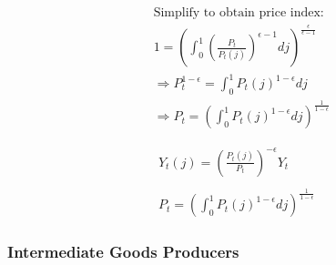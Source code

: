 \documentclass[11pt,preprint]{elsarticle}
\numberwithin{equation}{section}
\numberwithin{figure}{section}
\numberwithin{table}{section}
\begin{document}
\begin{align*}
& \\
\end{align*} \begin{align*} 
& \text{Simplify to obtain price index:} \\  
& 1 = \left( \int_0^1 \left( \frac{P_t}{P_t(j)} \right)^{\epsilon-1}  dj \right)^{\frac{\epsilon}{\epsilon-1}} \\  
& \Rightarrow P_t^{1-\epsilon} = \int_0^1 P_t(j)^{1-\epsilon}  dj \\  
& \Rightarrow P_t = \left( \int_0^1 P_t(j)^{1-\epsilon}  dj \right)^{\frac{1}{1-\epsilon}}  
\end{align*}

\begin{equation}\label{demand_and_price}  
\boxed{  
  \begin{gathered}  
  Y_t(j) = \left( \frac{P_t(j)}{P_t} \right)^{-\epsilon} Y_t \\  
  \\  
  P_t = \left( \int_0^1 P_t(j)^{1-\epsilon}  dj \right)^{\frac{1}{1-\epsilon}}  
  \end{gathered}  
}  
\end{equation}

\subsubsection{\texorpdfstring{Intermediate Goods Producers
\label{intermediate_good_producer_appendix}}{Intermediate Goods Producers }}\label{intermediate-goods-producers-1}
\end{document}

